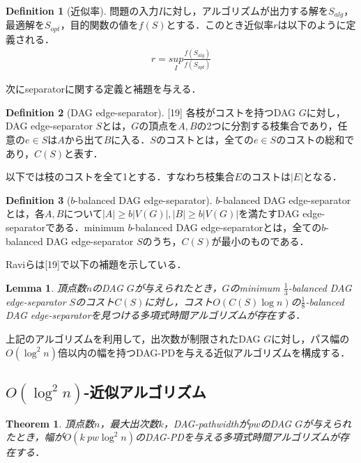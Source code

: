 \documentclass[master]{kuisthesis}		%
\theoremstyle{plain}
\newtheorem{theorem}{Theorem}
\newtheorem{lemma}{Lemma}
\theoremstyle{definition}
\newtheorem{definition*}{Definition}
\begin{document}
\begin{definition*}[近似率]
    問題の入力$I$に対し，アルゴリズムが出力する解を$S_{alg}$，最適解を$S_{opt}$，目的関数の値を$f(S)$とする．このとき近似率$r$は以下のように定義される．
    \begin{align*}
        r = \underset{I}{sup}\frac{f(S_{alg})}{f(S_{opt})}
    \end{align*}
    
\end{definition*}


次にseparatorに関する定義と補題を与える．


\begin{definition*}[DAG edge-separator][19]
    各枝がコストを持つDAG $G$に対し，DAG edge-separator $S$とは，$G$の頂点を$A, B$の2つに分割する枝集合であり，任意の$e \in S$は$A$から出て$B$に入る．$S$のコストとは，全ての$e \in S$のコストの総和であり，$C(S)$と表す．
\end{definition*}

以下では枝のコストを全て1とする．すなわち枝集合$E$のコストは$|E|$となる．

\begin{definition*}[$b$-balanced DAG edge-separator]
    $b$-balanced DAG edge-separatorとは，各$A, B$について$|A| \geq b|V(G)|, |B| \geq b|V(G)|$を満たすDAG edge-separatorである．minimum $b$-balanced DAG edge-separatorとは，全ての$b$-balanced DAG edge-separator $S$のうち，$C(S)$が最小のものである．
\end{definition*}

Raviらは[19]で以下の補題を示している．

\begin{lemma}\label{separator_algorithm}
    頂点数$n$のDAG $G$が与えられたとき，$G$のminimum $\frac{1}{3}$-balanced DAG edge-separator $S$のコスト$C(S)$に対し，コスト$O(C(S) \log n)$の$\frac{1}{8}$-balanced DAG edge-separatorを見つける多項式時間アルゴリズムが存在する．
\end{lemma}

上記のアルゴリズムを利用して，出次数が制限されたDAG $G$に対し，パス幅の$O(\log ^2 n)$倍以内の幅を持つDAG-PDを与える近似アルゴリズムを構成する．



\subsection{$O(\log ^2 n)$-近似アルゴリズム}

\begin{theorem}\label{approximation}
    頂点数$n$，最大出次数$k$，DAG-pathwidthが$pw$のDAG $G$が与えられたとき，幅が$O(k \ pw \log ^2 n)$のDAG-PDを与える多項式時間アルゴリズムが存在する．
\end{theorem}
\end{document}
